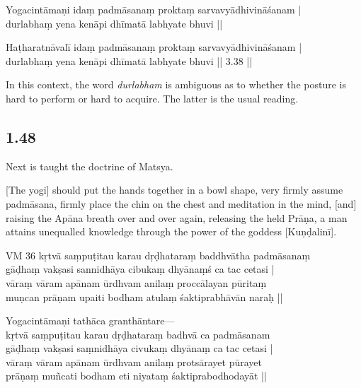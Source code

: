 \begin{ekdosis}
\begin{testimonia}[hp01_047]
Yogacintāmaṇi
\startverse
idaṃ padmāsanaṃ proktaṃ sarvavyādhivināśanam |\\
durlabhaṃ yena kenāpi dhīmatā labhyate bhuvi ||
\endverse

Haṭharatnāvalī
\startverse
idaṃ padmāsanaṃ proktaṃ sarvavyādhivināśanam |\\
durlabhaṃ yena kenāpi dhīmatā labhyate bhuvi || 3.38 ||
\endverse
\end{testimonia}

\begin{philcomm}[hp01_047]
In this context, the word \emph{durlabham} is ambiguous as to whether the posture is hard to perform or hard to acquire. The latter is the usual reading.
\end{philcomm}

\subsection*{1.48}
\begin{translation}[hp01_048]
Next is taught the doctrine of Matsya.

[The yogi] should put the hands together in a bowl shape, very firmly assume padmāsana, firmly place the chin on the chest and meditation in the mind, [and] raising the Apāna breath over and over again, releasing the held Prāṇa, a man attains unequalled knowledge through the power of the goddess [Kuṇḍalinī].
\end{translation}

\begin{sources}[hp01_048]
VM 36
\startverse
kṛtvā saṃpuṭitau karau dṛḍhataraṃ baddhvātha padmāsanaṃ\\
gāḍhaṃ vakṣasi sannidhāya cibukaṃ dhyānaṃś ca tac cetasi |\\
vāraṃ vāram apānam ūrdhvam anilaṃ proccālayan pūritaṃ\\
muṇcan prāṇam upaiti bodham atulaṃ śaktiprabhāvān naraḥ ||
\endverse
\end{sources}

\begin{testimonia}[hp01_048]
Yogacintāmaṇi
\startverse
tathāca granthāntare—\\
kṛtvā saṃpuṭitau karau dṛḍhataraṃ badhvā ca padmāsanam\\
gāḍhaṃ vakṣasi saṃnidhāya civukaṃ dhyānaṃ ca tac cetasi |\\
vāraṃ vāram apānam ūrdhvam anilaṃ protsārayet pūrayet\\
prāṇaṃ muñcati bodham eti niyataṃ śaktiprabodhodayāt ||
\endverse


\end{testimonia}
\end{ekdosis}
